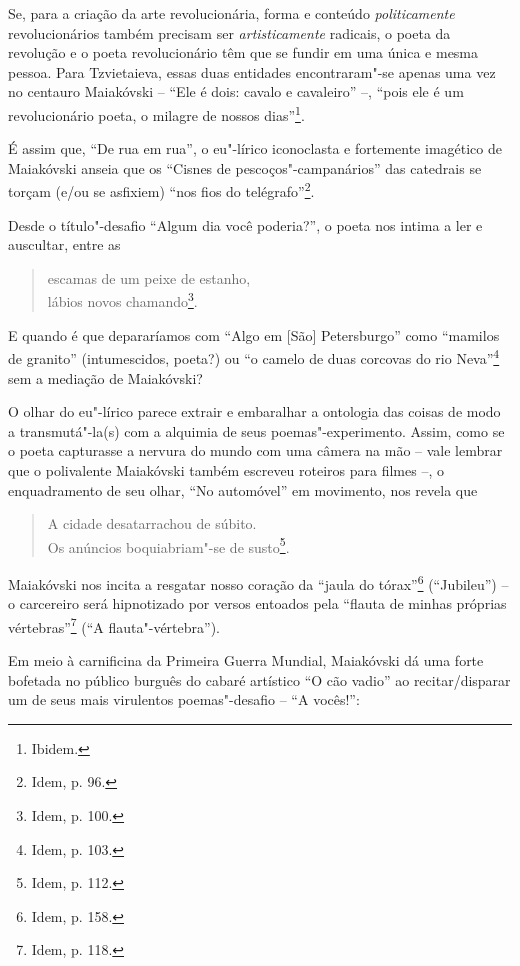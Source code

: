 Se, para a criação da arte revolucionária, forma e conteúdo
\emph{politicamente} revolucionários também precisam ser
\emph{artisticamente} radicais, o poeta da revolução e o poeta
revolucionário têm que se fundir em uma única e mesma pessoa. Para
Tzvietaieva, essas duas entidades encontraram"-se apenas uma vez no
centauro Maiakóvski -- ``Ele é dois: cavalo e cavaleiro'' --, ``pois ele
é um revolucionário poeta, o milagre de nossos dias''\footnote{Ibidem.}.

É assim que, ``De rua em rua'', o eu"-lírico iconoclasta e fortemente
imagético de Maiakóvski anseia que os ``Cisnes de pescoços"-campanários''
das catedrais se torçam (e/ou se asfixiem) ``nos fios do
telégrafo''\footnote{Idem, p. 96.}.

Desde o título"-desafio ``Algum dia você poderia?'', o poeta nos intima a
ler e auscultar, entre as

\begin{verse}
escamas de um peixe de estanho,\\
lábios novos chamando\footnote{Idem, p. 100.}.
\end{verse}

E quando é que depararíamos com ``Algo em {[}São{]} Petersburgo'' como
``mamilos de granito'' (intumescidos, poeta?) ou ``o camelo de duas
corcovas do rio Neva''\footnote{Idem, p. 103.} sem a mediação de
Maiakóvski?

O olhar do eu"-lírico parece extrair e embaralhar a ontologia das coisas
de modo a transmutá"-la(s) com a alquimia de seus poemas"-experimento.
Assim, como se o poeta capturasse a nervura do mundo com uma câmera na
mão -- vale lembrar que o polivalente Maiakóvski também escreveu
roteiros para filmes --, o enquadramento de seu olhar, ``No automóvel''
em movimento, nos revela que

\begin{verse}
A cidade desatarrachou de súbito.\\
Os anúncios boquiabriam"-se de susto\footnote{Idem, p. 112.}.
\end{verse}

Maiakóvski nos incita a resgatar nosso coração da ``jaula do
tórax''\footnote{Idem, p. 158.} (``Jubileu'') -- o carcereiro será
hipnotizado por versos entoados pela ``flauta de minhas próprias
vértebras''\footnote{Idem, p. 118.} (``A flauta"-vértebra'').

Em meio à carnificina da Primeira Guerra Mundial, Maiakóvski dá uma
forte bofetada no público burguês do cabaré artístico ``O cão vadio'' ao
recitar/disparar um de seus mais virulentos poemas"-desafio -- ``A
vocês!'':


